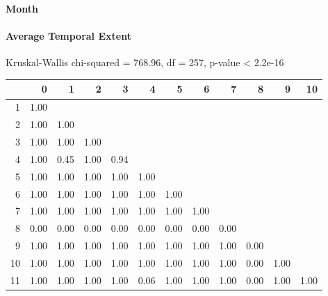 \Large
\centerline{\textbf{Month}}
\normalsize

\paragraph{Average Temporal Extent}
Kruskal-Wallis chi-squared = 768.96, df = 257, p-value < 2.2e-16

% 
\begin{tabular}{rrrrrrrrrrrr}
  \hline
 & 0 & 1 & 2 & 3 & 4 & 5 & 6 & 7 & 8 & 9 & 10 \\ 
  \hline
1 & 1.00 &  &  &  &  &  &  &  &  &  &  \\ 
  2 & 1.00 & 1.00 &  &  &  &  &  &  &  &  &  \\ 
  3 & 1.00 & 1.00 & 1.00 &  &  &  &  &  &  &  &  \\ 
  4 & 1.00 & 0.45 & 1.00 & 0.94 &  &  &  &  &  &  &  \\ 
  5 & 1.00 & 1.00 & 1.00 & 1.00 & 1.00 &  &  &  &  &  &  \\ 
  6 & 1.00 & 1.00 & 1.00 & 1.00 & 1.00 & 1.00 &  &  &  &  &  \\ 
  7 & 1.00 & 1.00 & 1.00 & 1.00 & 1.00 & 1.00 & 1.00 &  &  &  &  \\ 
  8 & 0.00 & 0.00 & 0.00 & 0.00 & 0.00 & 0.00 & 0.00 & 0.00 &  &  &  \\ 
  9 & 1.00 & 1.00 & 1.00 & 1.00 & 1.00 & 1.00 & 1.00 & 1.00 & 0.00 &  &  \\ 
  10 & 1.00 & 1.00 & 1.00 & 1.00 & 1.00 & 1.00 & 1.00 & 1.00 & 0.00 & 1.00 &  \\ 
  11 & 1.00 & 1.00 & 1.00 & 1.00 & 0.06 & 1.00 & 1.00 & 1.00 & 0.00 & 1.00 & 1.00 \\ 
   \hline
\end{tabular}
% 
